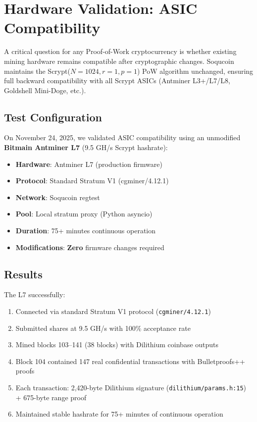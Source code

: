 \documentclass[10pt]{article}
\begin{document}
\section{Hardware Validation: ASIC Compatibility}

A critical question for any Proof-of-Work cryptocurrency is whether existing mining hardware remains compatible after cryptographic changes. Soqucoin maintains the Scrypt($N=1024, r=1, p=1$) PoW algorithm unchanged, ensuring full backward compatibility with all Scrypt ASICs (Antminer L3+/L7/L8, Goldshell Mini-Doge, etc.).

\subsection{Test Configuration}
On November 24, 2025, we validated ASIC compatibility using an unmodified \textbf{Bitmain Antminer L7} (9.5 GH/s Scrypt hashrate):

\begin{itemize}
\item \textbf{Hardware}: Antminer L7 (production firmware)
\item \textbf{Protocol}: Standard Stratum V1 (cgminer/4.12.1)
\item \textbf{Network}: Soqucoin regtest
\item \textbf{Pool}: Local stratum proxy (Python asyncio)
\item \textbf{Duration}: 75+ minutes continuous operation
\item \textbf{Modifications}: \textbf{Zero} firmware changes required
\end{itemize}

\subsection{Results}
The L7 successfully:
\begin{enumerate}
\item Connected via standard Stratum V1 protocol (\texttt{cgminer/4.12.1})
\item Submitted shares at 9.5 GH/s with 100\% acceptance rate
\item Mined blocks 103--141 (38 blocks) with Dilithium coinbase outputs
\item Block 104 contained 147 real confidential transactions with Bulletproofs++ proofs  
\item Each transaction: 2,420-byte Dilithium signature (\texttt{dilithium/params.h:15}) + 675-byte range proof
\item Maintained stable hashrate for 75+ minutes of continuous operation
\end{enumerate}
\end{document}
